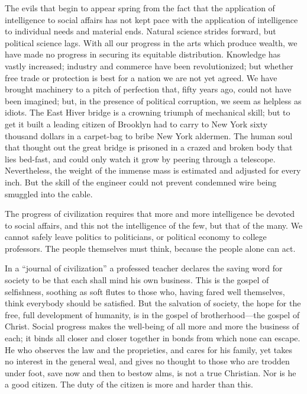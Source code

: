 \documentclass{book}
\begin{document}
The evils that begin to appear spring from the fact that the application of intelligence to social affairs has not kept pace with the application of intelligence to individual needs and material ends. Natural science strides forward, but political science lags. With all our progress in the arts which produce wealth, we have made no progress in securing its equitable distribution. Knowledge has vastly increased; industry and commerce have been revolutionized; but whether free trade or protection is best for a nation we are not yet agreed. We have brought machinery to a pitch of perfection that, fifty years ago, could not have been imagined; but, in the presence of political corruption, we seem as helpless as idiots. The East Hiver bridge is a crowning triumph of mechanical skill; but to get it built a leading citizen of Brooklyn had to carry to New York sixty thousand dollars in a carpet-bag to bribe New York aldermen. The human soul that thought out the great bridge is prisoned in a crazed and broken body that lies bed-fast, and could only watch it grow by peering through a telescope. Nevertheless, the weight of the immense mass is estimated and adjusted for every inch. But the skill of the engineer could not prevent condemned wire being smuggled into the cable.

The progress of civilization requires that more and more intelligence be devoted to social affairs, and this not the intelligence of the few, but that of the many. We cannot safely leave politics to politicians, or political economy to college professors. The people themselves must think, because the people alone can act.

In a “journal of civilization” a professed teacher declares the saving word for society to be that each shall mind his own business. This is the gospel of selfishness, soothing as soft flutes to those who, having fared well themselves, think everybody should be satisfied. But the salvation of society, the hope for the free, full development of humanity, is in the gospel of brotherhood—the gospel of Christ. Social progress makes the well-being of all more and more the business of each; it binds all closer and closer together in bonds from which none can escape. He who observes the law and the proprieties, and cares for his family, yet takes no interest in the general weal, and gives no thought to those who are trodden under foot, save now and then to bestow alms, is not a true Christian. Nor is he a good citizen. The duty of the citizen is more and harder than this.
\end{document}
